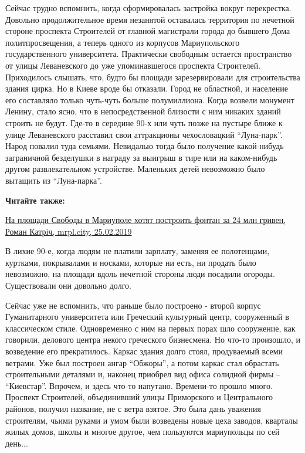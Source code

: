 Сейчас трудно вспомнить, когда сформировалась застройка вокруг перекрестка.
Довольно продолжительное время незанятой оставалась территория по нечетной
стороне проспекта Строителей от главной магистрали города до бывшего Дома
политпросвещения, а теперь одного из корпусов Мариупольского государственного
университета. Практически свободным остается пространство от улицы Леваневского
до уже упоминавшегося проспекта Строителей. Приходилось слышать, что, будто бы
площади зарезервировали для строительства здания цирка. Но в Киеве вроде бы
отказали. Город не областной, и население его составляло только чуть-чуть
больше полумиллиона. Когда возвели монумент Ленину, стало ясно, что в
непосредственной близости с ним никаких зданий строить не будут. Где-то в
середине 90-х или чуть позже на пустыре ближе к улице Леваневского расставил
свои аттракционы чехословацкий \enquote{Луна-парк}. Народ повалил туда семьями.
Невидалью тогда было получение какой-нибудь заграничной безделушки в награду за
выигрыш в тире или на каком-нибудь другом развлекательном устройстве. Маленьких
детей невозможно было вытащить из \enquote{Луна-парка}.

\textbf{Читайте также:} 

\href{https://mrpl.city/news/view/na-ploshhadi-svobody-v-mariupole-hotyat-postroit-fontan-za-24-mln-griven}{%
На площади Свободы в Мариуполе хотят построить фонтан за 24 млн гривен, Роман Катріч, mrpl.city, 25.02.2019}

В лихие 90-е, когда людям не платили зарплату, заменяя ее полотенцами,
куртками, покрывалами и носками, которые ни есть, ни продать было невозможно,
на площади вдоль нечетной стороны люди посадили огороды. Существовали они
довольно долго.

Сейчас уже не вспомнить, что раньше было построено - второй корпус
Гуманитарного университета или Греческий культурный центр, сооруженный в
классическом стиле. Одновременно с ним на первых порах шло сооружение, как
говорили, делового центра некого греческого бизнесмена. Но что-то произошло, и
возведение его прекратилось. Каркас здания долго стоял, продуваемый всеми
ветрами. Уже был построен ангар \enquote{Обжоры}, а потом каркас стал обрастать
строительными деталями и, наконец приобрел вид офиса солидной фирмы –
\enquote{Киевстар}. Впрочем, и здесь что-то напутано. Времени-то прошло много. Проспект
Строителей, объединивший улицы Приморского и Центрального районов, получил
название, не с ветра взятое. Это была дань уважения строителям, чьими руками и
умом были возведены новые цеха заводов, кварталы жилых домов, школы и многое
другое, чем пользуются мариупольцы по сей день...

